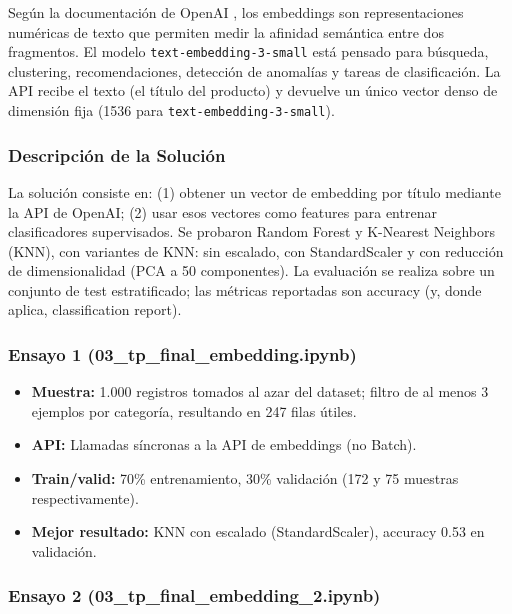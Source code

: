 \documentclass[11pt,a4paper]{article}
\begin{document}
Según la documentación de OpenAI \cite{openai-embedding}, los embeddings son representaciones numéricas de texto que permiten medir la afinidad semántica entre dos fragmentos. El modelo \texttt{text-embedding-3-small} está pensado para búsqueda, clustering, recomendaciones, detección de anomalías y tareas de clasificación. La API recibe el texto (el título del producto) y devuelve un único vector denso de dimensión fija (1536 para \texttt{text-embedding-3-small}).

\subsubsection{Descripción de la Solución}

La solución consiste en: (1) obtener un vector de embedding por título mediante la API de OpenAI; (2) usar esos vectores como features para entrenar clasificadores supervisados. Se probaron Random Forest y K-Nearest Neighbors (KNN), con variantes de KNN: sin escalado, con StandardScaler y con reducción de dimensionalidad (PCA a 50 componentes). La evaluación se realiza sobre un conjunto de test estratificado; las métricas reportadas son accuracy (y, donde aplica, classification report).

\subsubsection{Ensayo 1 (03\_tp\_final\_embedding.ipynb)}

\begin{itemize}
    \item \textbf{Muestra:} 1.000 registros tomados al azar del dataset; filtro de al menos 3 ejemplos por categoría, resultando en 247 filas útiles.
    \item \textbf{API:} Llamadas síncronas a la API de embeddings (no Batch).
    \item \textbf{Train/valid:} 70\% entrenamiento, 30\% validación (172 y 75 muestras respectivamente).
    \item \textbf{Mejor resultado:} KNN con escalado (StandardScaler), accuracy 0.53 en validación.
\end{itemize}

\subsubsection{Ensayo 2 (03\_tp\_final\_embedding\_2.ipynb)}
\end{document}
